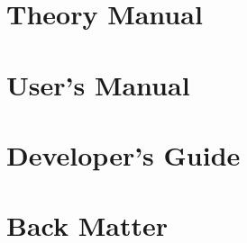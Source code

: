 \documentclass[pdf,11pt]{SANDreport}
\begin{document}
%
\setcounter{secnumdepth}{3}
\SANDmain %

\newpage
\part{Theory Manual}







\newpage
\part{User's Manual}




\newpage
\part{Developer's Guide}



\newpage
\part{Back Matter}



%
\clearpage
{}




%
%     

%


\clearpage
{}
\printindex{}



\end{document}

